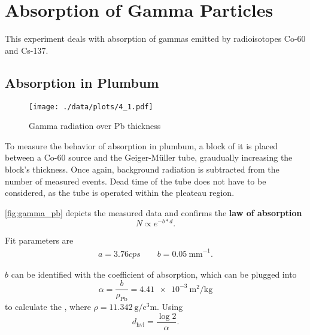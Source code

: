 \chapter{Absorption of Gamma Particles}
This experiment deals with absorption of gammas emitted by radioisotopes Co-60 and Cs-137.

\section{Absorption in Plumbum}
\begin{figure}[ht!]
	\centering
	\texttt{[image: ./data/plots/4\_1.pdf]}
	\caption[Gamma radiation over Pb thickness]{Gamma radiation over Pb thickness}
	\label{fig:gamma_pb}
\end{figure}
To measure the behavior of absorption in plumbum, a block of it is placed between a Co-60 source and the Geiger-Müller tube, graudually increasing the block's thickness.
Once again, background radiation is subtracted from the number of measured events.
Dead time of the tube does not have to be considered, as the tube is operated within the pleateau region.

\autoref{fig:gamma_pb} depicts the measured data and confirms the \textbf{law of absorption}
\begin{equation*}
	N\propto e^{-b*d}.
\end{equation*}

Fit parameters are
\begin{gather*}
	a=\num{3.76}cps\qquad b=\SI{0.05}{\milli\meter}^{-1}.
\end{gather*}

$b$ can be identified with the coefficient of absorption, which can be plugged into
\begin{equation*}
	\alpha=\frac{b}{\rho_\text{Pb}}=\SI{4.41e-3}{\meter\squared\per\kilogram}
\end{equation*}
to calculate the , where $\rho=\SI{11.342}{\gram\per\cubic\centi\meter}$.
Using
\begin{equation*}
	d_\text{hvl}=\frac{\log{2}}{\alpha}.
\end{equation*}
